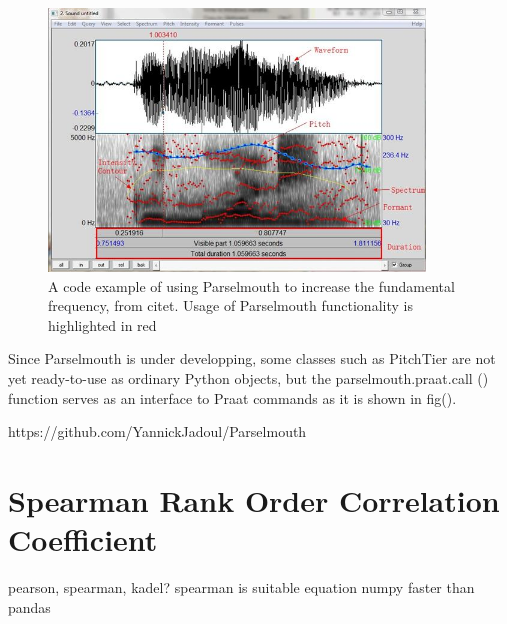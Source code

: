 \begin{figure}[ht]
	\center
	\includegraphics[width=10cm, scale=0.7]{figures/Praat.jpg}
	\caption{A code example of using Parselmouth to increase the fundamental frequency, from citet. Usage of Parselmouth functionality is highlighted in red}
	\label{fig:Parselmouth}
\end{figure}

Since Parselmouth is under developping, some classes such as PitchTier are not yet ready-to-use as ordinary Python objects, but the parselmouth.praat.call () function serves as an interface to Praat commands as it is shown in fig().

https://github.com/YannickJadoul/Parselmouth

\section{Spearman Rank Order Correlation Coefficient}
pearson, spearman, kadel?
spearman is suitable
equation
numpy faster than pandas



